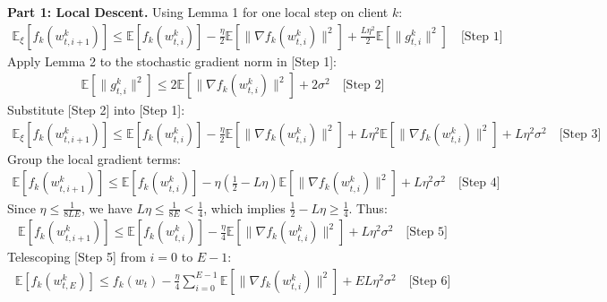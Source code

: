 \documentclass{article}
\begin{document}
\textbf{Part 1: Local Descent.} 
Using Lemma 1 for one local step on client $k$:
\begin{align}
    \mathbb{E}_{\xi}[f_k(w_{t,i+1}^k)] \leq \mathbb{E}[f_k(w_{t,i}^k)] - \frac{\eta}{2} \mathbb{E}[\|\nabla f_k(w_{t,i}^k)\|^2] + \frac{L \eta^2}{2} \mathbb{E}[\|g_{t,i}^k\|^2] \quad \text{[Step 1]}
\end{align}
Apply Lemma 2 to the stochastic gradient norm in [Step 1]:
\begin{align}
    \mathbb{E}[\|g_{t,i}^k\|^2] \leq 2 \mathbb{E}[\|\nabla f_k(w_{t,i}^k)\|^2] + 2\sigma^2 \quad \text{[Step 2]}
\end{align}
Substitute [Step 2] into [Step 1]:
\begin{align}
    \mathbb{E}_{\xi}[f_k(w_{t,i+1}^k)] \leq \mathbb{E}[f_k(w_{t,i}^k)] - \frac{\eta}{2} \mathbb{E}[\|\nabla f_k(w_{t,i}^k)\|^2] + L \eta^2 \mathbb{E}[\|\nabla f_k(w_{t,i}^k)\|^2] + L \eta^2 \sigma^2 \quad \text{[Step 3]}
\end{align}
Group the local gradient terms:
\begin{align}
    \mathbb{E}[f_k(w_{t,i+1}^k)] \leq \mathbb{E}[f_k(w_{t,i}^k)] - \eta \left( \frac{1}{2} - L \eta \right) \mathbb{E}[\|\nabla f_k(w_{t,i}^k)\|^2] + L \eta^2 \sigma^2 \quad \text{[Step 4]}
\end{align}
Since $\eta \leq \frac{1}{8LE}$, we have $L\eta \leq \frac{1}{8E} < \frac{1}{4}$, which implies $\frac{1}{2} - L\eta \geq \frac{1}{4}$. Thus:
\begin{align}
    \mathbb{E}[f_k(w_{t,i+1}^k)] \leq \mathbb{E}[f_k(w_{t,i}^k)] - \frac{\eta}{4} \mathbb{E}[\|\nabla f_k(w_{t,i}^k)\|^2] + L \eta^2 \sigma^2 \quad \text{[Step 5]}
\end{align}
Telescoping [Step 5] from $i=0$ to $E-1$:
\begin{align}
    \mathbb{E}[f_k(w_{t,E}^k)] \leq f_k(w_t) - \frac{\eta}{4} \sum_{i=0}^{E-1} \mathbb{E}[\|\nabla f_k(w_{t,i}^k)\|^2] + E L \eta^2 \sigma^2 \quad \text{[Step 6]}
\end{align}
\end{document}
